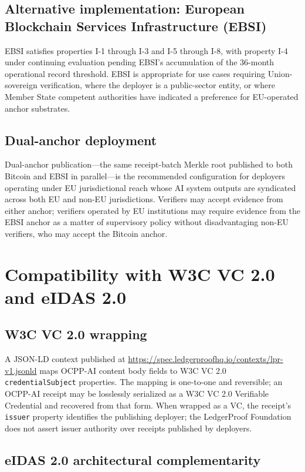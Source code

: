 \documentclass[11pt,a4paper]{article}
\begin{document}
\subsection{Alternative implementation: European Blockchain Services Infrastructure (EBSI)}

EBSI satisfies properties I-1 through I-3 and I-5 through I-8, with property I-4 under continuing evaluation pending EBSI's accumulation of the 36-month operational record threshold. EBSI is appropriate for use cases requiring Union-sovereign verification, where the deployer is a public-sector entity, or where Member State competent authorities have indicated a preference for EU-operated anchor substrates.

\subsection{Dual-anchor deployment}

Dual-anchor publication---the same receipt-batch Merkle root published to both Bitcoin and EBSI in parallel---is the recommended configuration for deployers operating under EU jurisdictional reach whose AI system outputs are syndicated across both EU and non-EU jurisdictions. Verifiers may accept evidence from either anchor; verifiers operated by EU institutions may require evidence from the EBSI anchor as a matter of supervisory policy without disadvantaging non-EU verifiers, who may accept the Bitcoin anchor.

\section{Compatibility with W3C VC 2.0 and eIDAS 2.0}

\subsection{W3C VC 2.0 wrapping}

A JSON-LD context published at \url{https://spec.ledgerproofhq.io/contexts/lpr-v1.jsonld} maps OCPP-AI content body fields to W3C VC 2.0 \texttt{credentialSubject} properties. The mapping is one-to-one and reversible; an OCPP-AI receipt may be losslessly serialized as a W3C VC 2.0 Verifiable Credential and recovered from that form. When wrapped as a VC, the receipt's \texttt{issuer} property identifies the publishing deployer; the LedgerProof Foundation does not assert issuer authority over receipts published by deployers.

\subsection{eIDAS 2.0 architectural complementarity}
\end{document}
